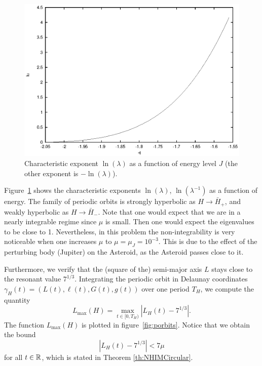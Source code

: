\begin{figure}
\includegraphics{figs/hypers}
\caption{Characteristic exponent $\ln(\lambda)$ as a function of
energy level $J$ (the other exponent is $-\ln(\lambda)$).}
\label{fig:hypers}
\end{figure}

Figure~\ref{fig:hypers} shows the characteristic exponents
$\ln(\lambda)$, $\ln(\lambda^{-1})$ as a function of energy.
The family of periodic orbits is strongly hyperbolic as $H \to \bar
H_+$, and weakly hyperbolic as $H\to \bar H_-$.
Note that one would expect that we are in a  nearly integrable regime
since $\mu$ is small. Then one would expect the eigenvalues to be
close to 1.
Nevertheless, in this problem the non-integrability is very noticeable
when one increases $\mu$ to $\mu=\mu_J=10^{-3}$. This is due to the effect of
the perturbing body (Jupiter) on the Asteroid, as the Asteroid passes
close to it.

Furthermore, we verify that the (square of the) semi-major axis $L$ stays
close to the resonant value $7^{1/3}$.
Integrating the periodic orbit in Delaunay coordinates
$\gamma_H(t)=(L(t),\ell(t),G(t),g(t))$ over one period $T_H$, we compute
the quantity
\begin{equation} \label{eq:Ldeviation}
 L_{\max}(H) = \max_{t \in [0,T_H)} |L_H(t)-7^{1/3}|.
\end{equation}
The function $L_{\max}(H)$ is plotted in figure~\ref{fig:porbits}.
Notice that we obtain the bound
\[ |L_H(t)-7^{1/3}| < 7\mu \]
for all $t\in \mathbb{R}$, which is stated in Theorem \ref{th:NHIMCircular}.

